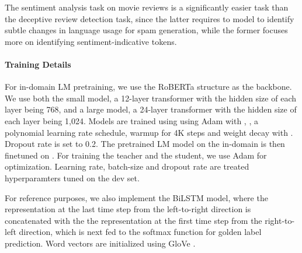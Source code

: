 \documentclass[11pt,a4paper]{article}
\begin{document}
The sentiment analysis task on movie reviews is a significantly easier task than the deceptive review detection task, 
 since the latter requires to model to identify subtle changes in language usage for spam generation, while the former focuses more on identifying sentiment-indicative tokens. 

\paragraph{Training Details}
For in-domain LM pretraining, we use the 
RoBERTa structure \citep{yinhan2019roberta} as the backbone. 
We use both the small model, a 12-layer transformer with the hidden size of each layer being 768,
and a large model, a 24-layer transformer with the hidden size of each layer being 1,024.
Models are trained using using Adam \citep{kingma2014adam} with , , a polynomial learning rate schedule, warmup for 4K steps and weight decay with . Dropout rate is set to 0.2. 
The pretrained LM model on the in-domain  is then finetuned on .
For training the teacher and the student,  we use Adam for optimization.  Learning rate, batch-size and dropout rate are treated hyperparamters tuned on the dev set. 

For reference purposes,  we also implement the BiLSTM model, where the representation at the last time step from the left-to-right direction is concatenated with the 
the representation at the first time step from the right-to-left direction, which is next fed to the softmax function for golden label prediction. 
Word vectors are initialized using GloVe  \citep{pennington2014glove}. 
\end{document}
